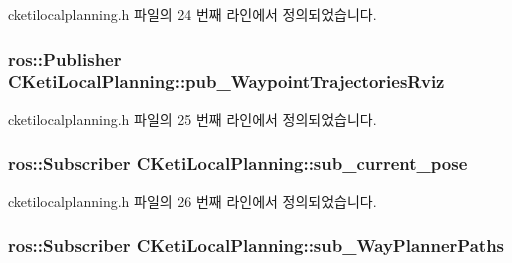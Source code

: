 cketilocalplanning.\+h 파일의 24 번째 라인에서 정의되었습니다.

\subsubsection[{\texorpdfstring{pub\+\_\+\+Waypoint\+Trajectories\+Rviz}{pub_WaypointTrajectoriesRviz}}]{\setlength{\rightskip}{0pt plus 5cm}ros\+::\+Publisher C\+Keti\+Local\+Planning\+::pub\+\_\+\+Waypoint\+Trajectories\+Rviz\hspace{0.3cm}{\ttfamily [protected]}}\hypertarget{class_c_keti_local_planning_a54aec2f11f157100a74b09a9cf5fa38b}{}\label{class_c_keti_local_planning_a54aec2f11f157100a74b09a9cf5fa38b}


cketilocalplanning.\+h 파일의 25 번째 라인에서 정의되었습니다.

\subsubsection[{\texorpdfstring{sub\+\_\+current\+\_\+pose}{sub_current_pose}}]{\setlength{\rightskip}{0pt plus 5cm}ros\+::\+Subscriber C\+Keti\+Local\+Planning\+::sub\+\_\+current\+\_\+pose\hspace{0.3cm}{\ttfamily [protected]}}\hypertarget{class_c_keti_local_planning_ac399c600a59f7b79448ba1f1bbfda8ca}{}\label{class_c_keti_local_planning_ac399c600a59f7b79448ba1f1bbfda8ca}


cketilocalplanning.\+h 파일의 26 번째 라인에서 정의되었습니다.

\subsubsection[{\texorpdfstring{sub\+\_\+\+Way\+Planner\+Paths}{sub_WayPlannerPaths}}]{\setlength{\rightskip}{0pt plus 5cm}ros\+::\+Subscriber C\+Keti\+Local\+Planning\+::sub\+\_\+\+Way\+Planner\+Paths\hspace{0.3cm}{\ttfamily [protected]}}\hypertarget{class_c_keti_local_planning_a75e59488889af86a89995f2c606677ce}{}\label{class_c_keti_local_planning_a75e59488889af86a89995f2c606677ce}


